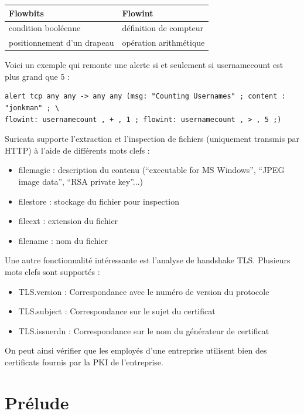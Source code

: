 \documentclass[a4paper,11pt,french]{article}
\begin{document}
\begin{center}
\begin{tabularx}{16cm}{|X|X|}
\hline
\textbf{Flowbits}&\textbf{Flowint}\\
\hline
condition booléenne  & définition de compteur\\
positionnement d’un drapeau & opération arithmétique\\
\hline
\end{tabularx}
\end{center}

Voici un exemple qui remonte une alerte si et seulement si usernamecount est plus grand que 5 :
\begin{Verbatim}
alert tcp any any -> any any (msg: "Counting Usernames" ; content : "jonkman" ; \
flowint: usernamecount , + , 1 ; flowint: usernamecount , > , 5 ;)
\end{Verbatim}

Suricata supporte l’extraction et l’inspection de fichiers (uniquement transmis par HTTP) à l’aide de différents mots clefs :
\begin{itemize}
\item filemagic : description du contenu (“executable for MS Windows”, “JPEG image data”, “RSA private key”...)
\item filestore : stockage du fichier pour inspection
\item fileext : extension du fichier
\item filename : nom du fichier
\end{itemize}

Une autre fonctionnalité intéressante est l’analyse de handshake TLS. Plusieurs mots clefs sont supportés :
\begin{itemize}
\item TLS.version : Correspondance avec le numéro de version du protocole
\item TLS.subject : Correspondance sur le sujet du certificat
\item TLS.issuerdn : Correspondance sur le nom du générateur de certificat
\end{itemize}

On peut ainsi vérifier que les employés d’une entreprise utilisent bien des certificats fournis par la PKI de l’entreprise. 


\section{Prélude}
\end{document}
